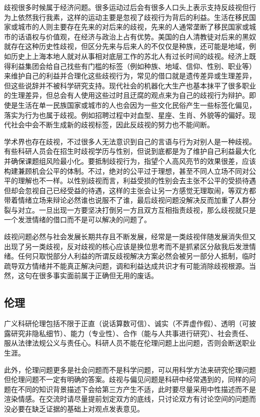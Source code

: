 \documentclass[]{tufte-book}
\begin{document}
歧视很多时候属于经济问题。很多运动过后会有很多人口头上表示支持反歧视但行为上依然我行我素，这样的运动主要是忽视了歧视行为背后的利益。生活在移民国家或城市的人则主要存在先来的对后来的歧视，先来的人通常垄断了移民国家或城市的话语权与价值观，在经济与政治上占有优势。美国的白人清教徒对后来的黑奴就存在这种历史性歧视，但区分先来与后来人的不仅仅是种族，还可能是地域，例如历史上上海本地人就对从事相对底层工作的苏北人有过长时间的歧视。经济上既得利益集团会给自己找些有门槛的标签（例如种族、地域、信仰、性别、职业等）来维护自己的利益并合理化这些歧视行为，常见的借口就是遗传差异或生理差异，但这些说辞并不被科学研究支持。现代社会的机器化大生产也基本抹平了很多职业的生理差异，但总会有人使用这些过时且迂腐的观点来为自己的歧视行为辩护。即使是生活在单一民族国家或城市的人也会因为一些文化民俗产生一些标签化偏见，落实为行为也属于歧视。例如招聘过程中对血型、星座、生肖、外貌等的偏好。现代社会中会不断生成新的歧视标签，因此反歧视的努力也不能间断。

学术界也存在歧视，不过很多人无法意识到自己的言语与行为对别人是一种歧视。有些科研人员会在招生时歧视学历与性别，但说到底都是为了维护自己利益最大化并确保课题组风险最小化。要抵制歧视行为，指望个人高风亮节的效果很差，应该构建兼顾机会公平的体制。不过，绝对的公平过于理想，甚至不同人立场不同对公平的理解也不一样。以性别歧视而言，利益受损的性别会去主张不公平的受损待遇但却会忽视自己已经受益的待遇，这样的主张会让另一方感觉无理取闹，等双方都带着情绪立场来辩论必然谁也说服不了谁，最后歧视问题没解决反而加重了人群分裂与对立。一旦出现一方要坚决打倒另一方且双方互相指责歧视，那么歧视就只是一个发泄情绪的借口而不是可以解决的问题了。

歧视问题必然与社会发展长期共存且不断发展，经常是一类歧视伴随发展消失但又出现了另一类歧视，反对歧视的核心应该是换位思考而不是抓紧区分敌我后发泄情绪。任何只取悦部分人利益的所谓反歧视解决方案必然会被另一部分人抵制，临时疏导双方情绪并不能真正解决问题，调和利益达成共识才有可能消除歧视根源。当然，这句在很多事实面前属于正确但无用的废话。

\hypertarget{ux4f26ux7406}{%
\subsection{伦理}\label{ux4f26ux7406}}

广义科研伦理包括不限于正直（说话算数可信）、诚实（不弄虚作假）、透明（可披露研究非隐私细节）、能力（专业性）、合作（能与人共事进行研究）、社会责任、服从法律法规公义与责任心。科研人员不能在伦理问题上出问题，否则会断送职业生涯。

此外，伦理问题更多是社会问题而不是科学问题，可以用科学方法来研究伦理问题但伦理问题不一定有明确的答案。歧视与偏见问题是科研中经常遇到的，同样的问题在不同的知识背景描述下会给第三方产生不适，此时要尽量采用中性描述而不是渲染情感。在交流时请尽量提前划定双方的底线，只讨论双方有讨论空间的问题而没必要在缺乏证据的基础上对观点发表意见。
\end{document}
